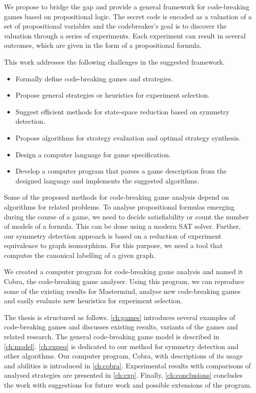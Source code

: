 We propose to bridge the gap and provide
  a general framework for code-breaking games
  based on propositional logic.
The secret code is encoded as a valuation of
  a set of propositional variables
  and the codebreaker's goal is to discover the valuation
  through a series of experiments.
Each experiment can result in several outcomes,
  which are given in the form of a propositional formula.

This work addresses the following challenges in the suggested framework.
\begin{itemize}
\item Formally define code-breaking games and strategies.
\item Propose general strategies or heuristics for experiment selection.
\item Suggest efficient methods for state-space reduction based on symmetry detection.
\item Propose algorithms for strategy evaluation and optimal strategy synthesis.
\item Design a computer language for game specification.
\item Develop a computer program that parses a game description from the
  designed language and implements the suggested algorithms.
\end{itemize}

Some of the proposed methods for code-breaking game analysis depend
  on algorithms for related problems.
To analyse propositional formulas emerging during the course of a game,
  we need to decide satisfiability or count the number of models of
  a formula. This can be done using a modern SAT solver.
Further, our symmetry detection approach is based on a reduction
  of experiment equivalence to graph isomorphism.
For this purpose, we need a tool that computes the canonical labelling of a
 given graph.

We created a computer program for code-breaking game analysis and named it Cobra,
  the code-breaking game analyser.
Using this program, we can reproduce some of the existing results
  for Mastermind, analyse new code-breaking games and easily evaluate new heuristics
  for experiment selection.

The thesis is structured as follows.
\autoref{ch:games} introduces several examples of code-breaking games and
  discusses existing results, variants of the games and related research.
The general code-breaking game model is described in \autoref{ch:model}.
\autoref{ch:expeq} is dedicated to our method for symmetry detection and other algorithms.
Our computer program, Cobra, with descriptions of its usage and
  abilities is introduced in \autoref{ch:cobra}.
Experimental results with comparisons of analysed strategies
  are presented in \autoref{ch:exp}.
Finally, \autoref{ch:conclusions} concludes the work with suggestions for future work
  and possible extensions of the program.






